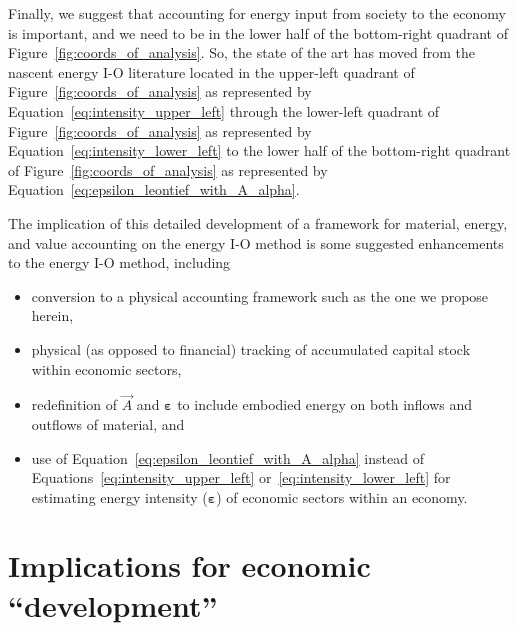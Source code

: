 Finally, we suggest that accounting for energy input from society
to the economy is important, 
and we need to be in the lower half of the bottom-right quadrant
of Figure~\ref{fig:coords_of_analysis}.
So, the state of the art has moved from the nascent energy I-O literature
located in the upper-left quadrant of Figure~\ref{fig:coords_of_analysis}
as represented by Equation~\ref{eq:intensity_upper_left}
through the lower-left quadrant of Figure~\ref{fig:coords_of_analysis}
as represented by Equation~\ref{eq:intensity_lower_left}
to the lower half of the bottom-right quadrant 
of Figure~\ref{fig:coords_of_analysis}
as represented by Equation~\ref{eq:epsilon_leontief_with_A_alpha}.

The implication of this detailed development of a framework for
material, energy, and value accounting on the energy I-O method is 
some suggested enhancements to the energy I-O method, 
including

\begin{itemize}
	\item{conversion to a physical accounting framework such as the one we propose herein,}
	\item{physical (as opposed to financial) tracking 
	of accumulated capital stock within economic sectors,}
	\item{redefinition of $\vec{A}$ and $\boldsymbol{\varepsilon}$ to include
	embodied energy on both inflows and outflows of material, and}
	\item{use of Equation~\ref{eq:epsilon_leontief_with_A_alpha} instead of
	Equations~\ref{eq:intensity_upper_left} or~\ref{eq:intensity_lower_left}
	for estimating energy intensity ($\boldsymbol{\varepsilon}$)
	of economic sectors within an economy.}
\end{itemize}
 

\section{Implications for economic ``development''}
\label{sec:implications_for_development}

